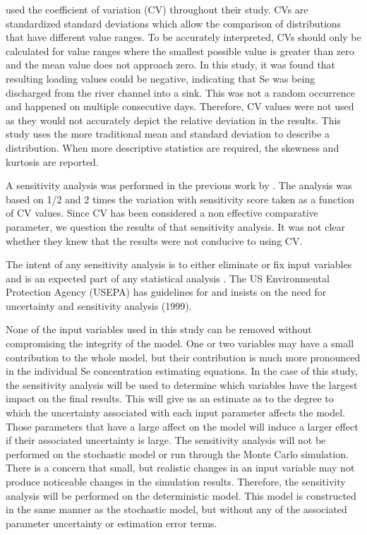 \citeauthor{Mueller2008} used the coefficient of variation (CV) throughout their study.  CVs are standardized standard deviations which allow the comparison of distributions that have different value ranges.  To be accurately interpreted, CVs should only be calculated for value ranges where the smallest possible value is greater than zero and the mean value does not approach zero.  In this study, it was found that resulting loading values could be negative, indicating that Se was being discharged from the river channel into a sink.  This was not a random occurrence and happened on multiple consecutive days.  Therefore, CV values were not used as they would not accurately depict the relative deviation in the results.  This study uses the more traditional mean and standard deviation to describe a distribution.  When more descriptive statistics are required, the skewness and kurtosis are reported.

A sensitivity analysis was performed in the previous work by \citeauthor{Mueller2008}.  The analysis was based on 1/2 and 2 times the variation with sensitivity score taken as a function of CV values.  Since CV has been considered a non effective comparative parameter, we question the results of that sensitivity analysis.  It was not clear whether they knew that the results were not conducive to using CV.

The intent of any sensitivity analysis is to either eliminate or fix input variables and is an expected part of any statistical analysis \citep{Saltelli2004}.  The US Environmental Protection Agency (USEPA) has guidelines for and insists on the need for uncertainty and sensitivity analysis (1999).

None of the input variables used in this study can be removed without compromising the integrity of the model.  One or two variables may have a small contribution to the whole model, but their contribution is much more pronounced in the individual Se concentration estimating equations.  In the case of this study, the sensitivity analysis will be used to determine which variables have the largest impact on the final results.  This will give us an estimate as to the degree to which the uncertainty associated with each input parameter affects the model.  Those parameters that have a large affect on the model will induce a larger effect if their associated uncertainty is large.  The sensitivity analysis will not be performed on the stochastic model or run through the Monte Carlo simulation.  There is a concern that small, but realistic changes in an input variable may not produce noticeable changes in the simulation results.  Therefore, the sensitivity analysis will be performed on the deterministic model.  This model is constructed in the same manner as the stochastic model, but without any of the associated parameter uncertainty or estimation error terms.

